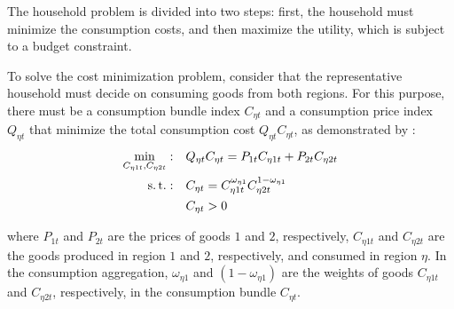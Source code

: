 \documentclass[../thesis.tex]{subfiles}
\begin{document}

The household problem is divided into two steps: first, the household must minimize the consumption costs, and then maximize the utility, which is subject to a budget constraint.



To solve the cost minimization problem, consider that the representative household must decide on consuming goods from both regions. For this purpose, there must be a consumption bundle index $C_{\eta t}$ and a consumption price index $Q_{\eta t}$ that minimize the total consumption cost $Q_{\eta t} C_{\eta t}$, as demonstrated by \textcite[p. 424]{walsh_monetary_2017}:
	\begin{align}
		\min_{C_{\eta 1 t}, C_{\eta 2 t}}: &\quad Q_{\eta t} C_{\eta t} = P_{1 t} C_{\eta 1t} + P_{2 t} C_{\eta 2t} \label{eq_v2:reg-consumption-cost}
		\\
		\operatorname{s.t.}: &\quad C_{\eta t} = C_{\eta 1 t}^{\omega_{\eta 1}} C_{\eta 2 t}^{1-\omega_{\eta 1}} \label{eq_v2:reg-consumption-aggregation} \\
		&\quad C_{\eta t} > 0 \nonumber
	\end{align}

	where $P_{1t}$ and $P_{2t}$ are the prices of goods $1$ and $2$, respectively, $C_{\eta 1 t}$ and $C_{\eta 2 t}$ are the goods produced in region $1$ and $2$, respectively, and consumed in region $\eta$. In the consumption aggregation, ${\omega_{\eta 1}}$ and $({1 - \omega_{\eta 1}})$ are the weights of goods $C_{\eta 1 t}$ and $C_{\eta 2 t}$, respectively, in the consumption bundle $C_{\eta t}$.
\end{document}
